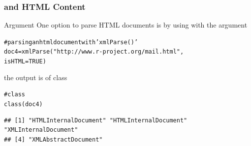 \documentclass{beamer}\usepackage[]{graphicx}\usepackage[]{color}
\makeatletter
\newcommand{\hlnum}[1]{\textcolor[rgb]{0.063,0.58,0.627}{#1}}%
\newcommand{\hlstr}[1]{\textcolor[rgb]{0.063,0.58,0.627}{#1}}%
\newcommand{\hlcom}[1]{\textcolor[rgb]{0.588,0.588,0.588}{#1}}%
\newcommand{\hlstd}[1]{\textcolor[rgb]{0.196,0.196,0.196}{#1}}%
\newcommand{\hlkwb}[1]{\textcolor[rgb]{0.627,0,0.314}{#1}}%
\newcommand{\hlkwc}[1]{\textcolor[rgb]{0,0.631,0.314}{#1}}%
\newcommand{\hlkwd}[1]{\textcolor[rgb]{0.78,0.227,0.412}{#1}}%
\newenvironment{kframe}{%
 \def\at@end@of@kframe{}%
 \ifinner\ifhmode%
  \def\at@end@of@kframe{\end{minipage}}%
  \begin{minipage}{\columnwidth}%
 \fi\fi%
 \def\FrameCommand##1{\hskip\@totalleftmargin \hskip-\fboxsep
 \colorbox{shadecolor}{##1}\hskip-\fboxsep
     \hskip-\linewidth \hskip-\@totalleftmargin \hskip\columnwidth}%
 \MakeFramed {\advance\hsize-\width
   \@totalleftmargin\z@ \linewidth\hsize
   \@setminipage}}%
 {\par\unskip\endMakeFramed%
 \at@end@of@kframe}
\newenvironment{knitrout}{}{} %
\makeatother
\begin{document}

\begin{frame}[fragile]
\frametitle{ and HTML Content}

\begin{block}{Argument }
One option to parse HTML documents is by using  with the argument 

\begin{knitrout}\tiny
{}\color{fgcolor}\begin{kframe}
\begin{alltt}
\hlcom{# parsing an html document with 'xmlParse()'}
\hlstd{doc4} \hlkwb{=} \hlkwd{xmlParse}\hlstd{(}\hlstr{"http://www.r-project.org/mail.html"}\hlstd{,}
                \hlkwc{isHTML} \hlstd{=} \hlnum{TRUE}\hlstd{)}
\end{alltt}
\end{kframe}
\end{knitrout}

the output is of class 



\begin{knitrout}\tiny
{}\color{fgcolor}\begin{kframe}
\begin{alltt}
\hlcom{# class }
\hlkwd{class}\hlstd{(doc4)}
\end{alltt}
\begin{verbatim}
## [1] "HTMLInternalDocument" "HTMLInternalDocument" "XMLInternalDocument" 
## [4] "XMLAbstractDocument"
\end{verbatim}
\end{kframe}
\end{knitrout}
\end{block}

\end{frame}

\end{document}
